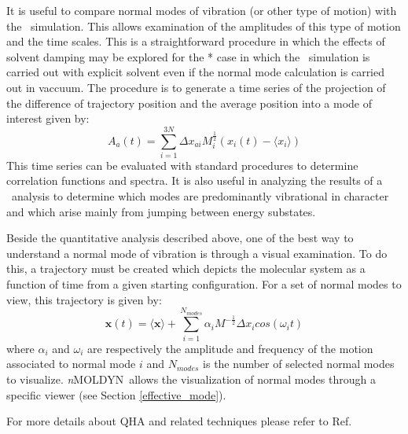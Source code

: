 \documentclass[a4paper,11pt]{report}
\newcommand{\NMOLDYN}{\textit{n}MOLDYN}
\begin{document}
\begin{itemize}
It is useful to compare normal modes of vibration (or other type of motion) with the \MD\ simulation. This allows examination of the 
amplitudes of this type of motion and the time scales. This is a straightforward procedure in which the effects of solvent damping may be explored for the *
case in which the \MD\ simulation is carried out with explicit solvent even if the normal mode calculation is carried out in vaccuum. The procedure 
is to generate a time series of the projection of the difference of trajectory position and the average position into a mode of interest given by:
\begin{equation}
\label{eq:qha_at}
A_a(t) = \sum_{i=1}^{3N} \Delta x_{ai} M_i^{\frac{1}{2}} \left(x_i(t) - \langle x_i\rangle\right)
\end{equation}
This time series can be evaluated with standard procedures to determine correlation functions and spectra. It is also useful in analyzing the 
results of a \QHA\ analysis to determine which modes are predominantly vibrational in character and which arise mainly from jumping between energy 
substates.
\end{itemize}

Beside the quantitative analysis described above, one of the best way to understand a normal mode of vibration is through a 
visual examination. To do this, a trajectory must be created which depicts the molecular system as a function of time from a 
given starting configuration. For a set of normal modes to view, this trajectory is given by:
\begin{equation}
\label{eq:qha_trajectory}
\textbf{x}(t) = \langle \textbf{x} \rangle + \sum_{i=1}^{N_{modes}} \alpha_i M^{-\frac{1}{2}}\Delta x_i cos(\omega_i t)
\end{equation}
where $\alpha_i$ and $\omega_i$ are respectively the amplitude and frequency of the motion associated to normal mode $i$ and 
$N_{modes}$ is the number of selected normal modes to visualize. \NMOLDYN\ allows the visualization of normal modes through a 
specific viewer (see Section \ref{effective_mode}).

For more details about QHA and related techniques please refer to Ref. \cite{Karplus}
\end{document}
